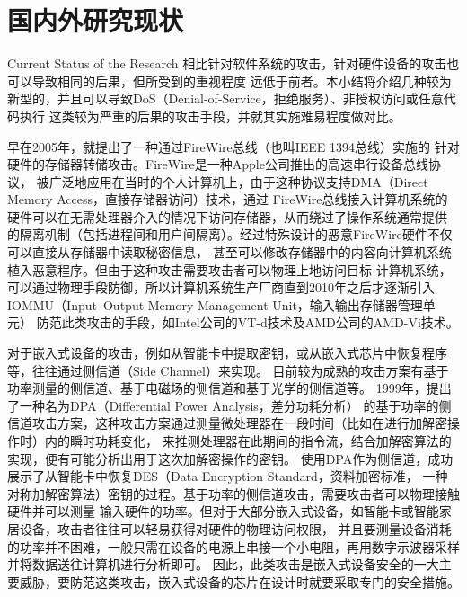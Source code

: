 \section{国内外研究现状}{Current Status of the Research}
相比针对软件系统的攻击，针对硬件设备的攻击也可以导致相同的后果，但所受到的重视程度
远低于前者。本小结将介绍几种较为新型的，并且可以导致DoS（Denial-of-Service，拒绝服务）、非授权访问或任意代码执行
这类较为严重的后果的攻击手段，并就其实施难易程度做对比。

早在2005年，\citet{becher2005firewire}就提出了一种通过FireWire总线（也叫IEEE 1394总线）实施的
针对硬件的存储器转储攻击。FireWire是一种Apple公司推出的高速串行设备总线协议，
被广泛地应用在当时的个人计算机上，由于这种协议支持DMA（Direct Memory Access，直接存储器访问）技术，通过
FireWire总线接入计算机系统的硬件可以在无需处理器介入的情况下访问存储器，从而绕过了操作系统通常提供
的隔离机制（包括进程间和用户间隔离）。经过特殊设计的恶意FireWire硬件不仅可以直接从存储器中读取秘密信息，
甚至可以修改存储器中的内容向计算机系统植入恶意程序。但由于这种攻击需要攻击者可以物理上地访问目标
计算机系统，可以通过物理手段防御，所以计算机系统生产厂商直到2010年之后才逐渐引入IOMMU（Input–Output Memory Management Unit，输入输出存储器管理单元）
防范此类攻击的手段，如Intel公司的VT-d技术及AMD公司的AMD-Vi技术。

对于嵌入式设备的攻击，例如从智能卡中提取密钥，或从嵌入式芯片中恢复程序等，往往通过侧信道（Side Channel）来实现。
目前较为成熟的攻击方案有基于功率测量的侧信道、基于电磁场的侧信道和基于光学的侧信道等。
1999年，\citet{kocher1999differential}提出了一种名为DPA（Differential Power Analysis，差分功耗分析）
的基于功率的侧信道攻击方案，这种攻击方案通过测量微处理器在一段时间（比如在进行加解密操作时）内的瞬时功耗变化，
来推测处理器在此期间的指令流，结合加解密算法的实现，便有可能分析出用于这次加解密操作的密钥。
\citet{kocher1999differential}使用DPA作为侧信道，成功展示了从智能卡中恢复DES（Data Encryption Standard，资料加密标准，
一种对称加解密算法）密钥的过程。基于功率的侧信道攻击，需要攻击者可以物理接触硬件并可以测量
输入硬件的功率。但对于大部分嵌入式设备，如智能卡或智能家居设备，攻击者往往可以轻易获得对硬件的物理访问权限，
并且要测量设备消耗的功率并不困难，一般只需在设备的电源上串接一个小电阻，再用数字示波器采样并将数据送往计算机进行分析即可。
因此，此类攻击是嵌入式设备安全的一大主要威胁，要防范这类攻击，嵌入式设备的芯片在设计时就要采取专门的安全措施。

